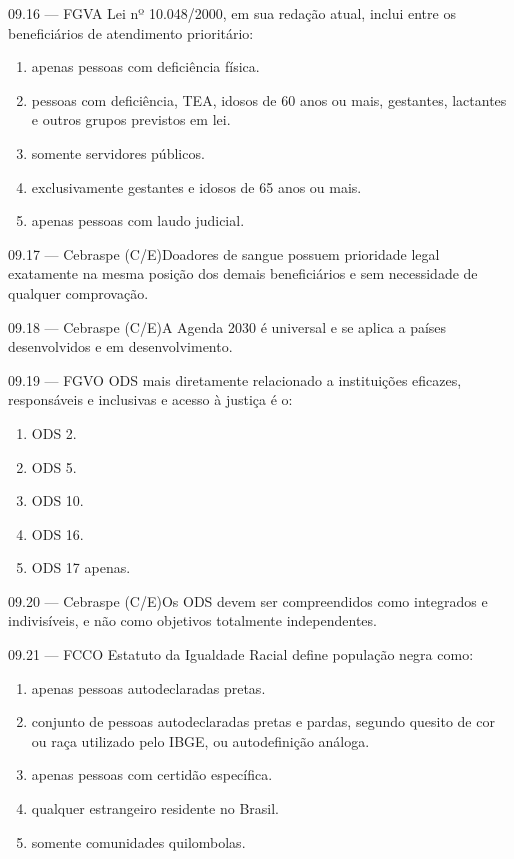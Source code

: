 \begin{questao}{ 09.16 — FGV}A Lei nº 10.048/2000, em sua redação atual, inclui entre os beneficiários de atendimento prioritário:\begin{enumerate}[label=\Alph*)]\item apenas pessoas com deficiência física.\item pessoas com deficiência, TEA, idosos de 60 anos ou mais, gestantes, lactantes e outros grupos previstos em lei.\item somente servidores públicos.\item exclusivamente gestantes e idosos de 65 anos ou mais.\item apenas pessoas com laudo judicial.\end{enumerate}\end{questao}
\begin{questao}{ 09.17 — Cebraspe (C/E)}Doadores de sangue possuem prioridade legal exatamente na mesma posição dos demais beneficiários e sem necessidade de qualquer comprovação.\end{questao}
\begin{questao}{ 09.18 — Cebraspe (C/E)}A Agenda 2030 é universal e se aplica a países desenvolvidos e em desenvolvimento.\end{questao}
\begin{questao}{ 09.19 — FGV}O ODS mais diretamente relacionado a instituições eficazes, responsáveis e inclusivas e acesso à justiça é o:\begin{enumerate}[label=\Alph*)]\item ODS 2.\item ODS 5.\item ODS 10.\item ODS 16.\item ODS 17 apenas.\end{enumerate}\end{questao}
\begin{questao}{ 09.20 — Cebraspe (C/E)}Os ODS devem ser compreendidos como integrados e indivisíveis, e não como objetivos totalmente independentes.\end{questao}
\begin{questao}{ 09.21 — FCC}O Estatuto da Igualdade Racial define população negra como:\begin{enumerate}[label=\Alph*)]\item apenas pessoas autodeclaradas pretas.\item conjunto de pessoas autodeclaradas pretas e pardas, segundo quesito de cor ou raça utilizado pelo IBGE, ou autodefinição análoga.\item apenas pessoas com certidão específica.\item qualquer estrangeiro residente no Brasil.\item somente comunidades quilombolas.\end{enumerate}\end{questao}
